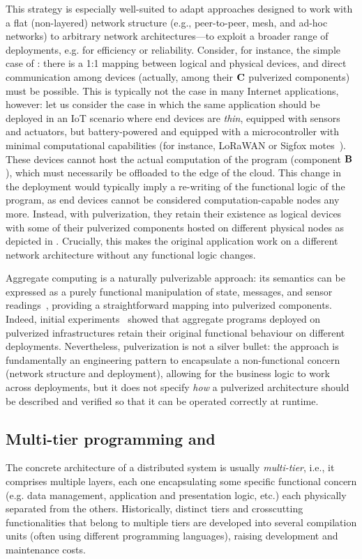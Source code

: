 This strategy is especially well-suited to adapt approaches designed to work with a flat (non-layered) network structure (e.g., peer-to-peer, mesh, and ad-hoc networks) 
 to arbitrary network architectures---to exploit a broader range of deployments, e.g. for efficiency or reliability.
%
Consider, for instance, the simple case of
:
 there is a 1:1 mapping between logical and physical devices, 
 and direct communication among devices (actually, among their $\mathbf{C}$ pulverized components) must be possible.
%
This is typically not the case in many Internet applications, however:
 let us consider the case in which the same application should be deployed in an IoT scenario where end devices are \emph{thin},
 equipped with sensors and actuators, but battery-powered and equipped with a microcontroller with minimal computational capabilities
(for instance, LoRaWAN or Sigfox motes~\cite{MekkiBCM18}).
%
These devices cannot host the actual computation of the program 
 (component $\mathbf{B}$), which must necessarily be offloaded to the edge of the cloud.
%
This change in the deployment would typically imply a re-writing of the functional logic of the program,
 as end devices cannot be considered computation-capable nodes any more.
%
Instead, with pulverization, they retain their existence as logical devices
 with some of their pulverized components hosted on different physical nodes as depicted in
.
%
Crucially, this makes the original application work on a different network architecture without any functional logic changes.

Aggregate computing is a naturally pulverizable approach:
 its semantics can be expressed as a purely functional manipulation of state, messages, and sensor readings~\cite{DBLP:journals/jlap/ViroliBDACP19},
 providing a straightforward mapping into pulverized components.
%
Indeed, initial experiments~\cite{DBLP:journals/fi/CasadeiPPVW20}
showed that aggregate programs deployed on pulverized infrastructures retain their original functional behaviour on different deployments.
%
Nevertheless, pulverization is not a silver bullet:
 the approach is fundamentally an engineering pattern to encapsulate a non-functional concern
 (network structure and deployment),
 allowing for the business logic to work across deployments,
 but it does not specify \emph{how} 
 a pulverized architecture should be described
 and verified so that it can be operated correctly at runtime.

\subsection{Multi-tier programming and \scalaloci{}}
The concrete architecture of a distributed system is usually \emph{multi-tier}, i.e.,
 it comprises multiple layers, each one encapsulating some specific functional concern 
 (e.g. data management, application and presentation logic, etc.)
 each physically separated from the others.
%
Historically, distinct tiers and crosscutting functionalities that belong to multiple tiers are developed into several compilation units 
 (often using different programming languages), 
 raising development and maintenance costs.

